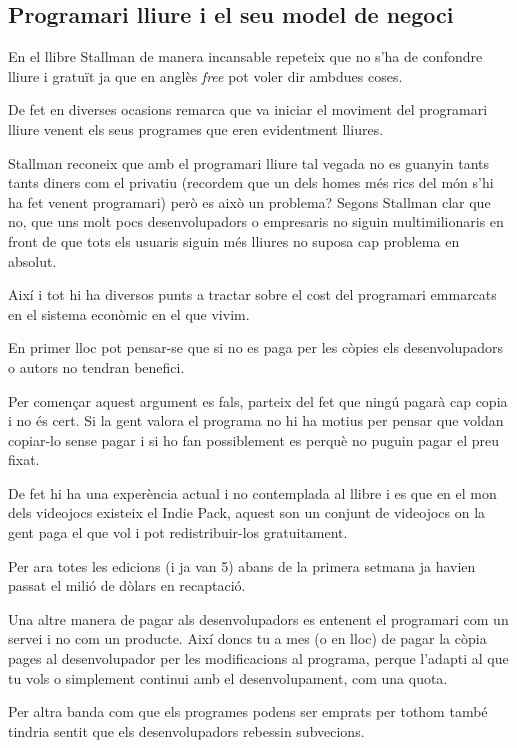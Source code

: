 \documentclass[a4paper,11pt]{scrartcl}
\begin{document}
\subsection{Programari lliure i el seu model de negoci}

En el llibre Stallman de manera incansable repeteix que no s'ha de confondre
lliure i gratuït ja que en anglès \emph{free} pot voler dir ambdues coses.

De fet en diverses ocasions remarca que va iniciar el moviment del programari lliure
venent els seus programes que eren evidentment lliures.

Stallman reconeix que amb el programari lliure tal vegada no es guanyin tants tants
diners com el privatiu (recordem que un dels homes més rics del món s'hi ha fet 
venent programari) però es això un problema? Segons Stallman clar que no, que uns
molt pocs desenvolupadors o empresaris no siguin multimilionaris en front
de que tots els usuaris siguin més lliures no suposa cap problema en absolut.

Així i tot hi ha diversos punts a tractar sobre el cost del programari
emmarcats en el sistema econòmic en el que vivim.

En primer lloc pot pensar-se que si no es paga per les còpies els
desenvolupadors o autors no tendran benefici.

Per començar aquest argument es fals, parteix del fet que ningú
pagarà cap copia i no és cert. Si la gent valora el programa
no hi ha motius per pensar que voldan copiar-lo sense pagar i si
ho fan possiblement es perquè no puguin pagar el preu fixat.

De fet hi ha una experència actual i no contemplada al llibre i 
es que en el mon dels videojocs existeix el Indie Pack, aquest
son un conjunt de videojocs on la gent
paga el que vol i pot redistribuir-los gratuitament.

Per ara totes les edicions (i ja van 5) abans de la primera
setmana ja havien passat el milió de dòlars en recaptació.

Una altre manera de pagar als desenvolupadors es entenent
el programari com un servei i no com un producte. Així doncs
tu a mes (o en lloc) de pagar la còpia pages al desenvolupador
per les modificacions al programa, perque l'adapti al que tu vols
o simplement continui amb el desenvolupament, com una quota.

Per altra banda com que els programes podens ser emprats per
tothom també tindria sentit que els desenvolupadors rebessin subvecions.
\end{document}
